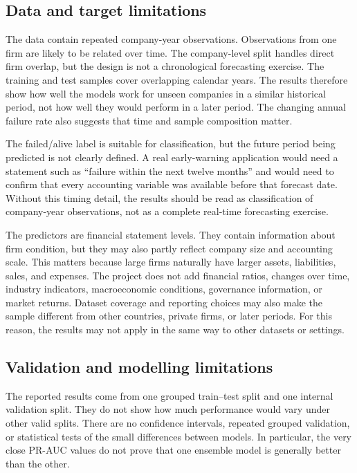 \documentclass[11pt,a4paper]{article}
\begin{document}
\subsection{Data and target limitations}

The data contain repeated company-year observations. Observations from one firm
are likely to be related over time. The company-level split handles direct firm
overlap, but the design is not a chronological forecasting exercise. The
training and test samples cover overlapping calendar years. The results
therefore show how well the models work for unseen companies in a similar
historical period, not how well they would perform in a later period. The changing annual failure
rate also suggests that time and sample composition matter.

The failed/alive label is suitable for classification, but the future period
being predicted is not clearly defined. A real early-warning application
would need a statement such as ``failure within the next twelve months'' and
would need to confirm that every accounting variable was available before that
forecast date. Without this timing detail, the results should be read as
classification of company-year observations, not as a complete real-time
forecasting exercise.

The predictors are financial statement levels. They contain information about
firm condition, but they may also partly reflect company size and accounting
scale. This matters because large firms naturally have larger assets,
liabilities, sales, and expenses. The project does not add financial ratios,
changes over time, industry indicators, macroeconomic conditions, governance
information, or market returns. Dataset coverage and reporting choices may also
make the sample different from other countries, private firms, or later periods.
For this reason, the results may not apply in the same way to other datasets or
settings.

\subsection{Validation and modelling limitations}

The reported results come from one grouped train--test split and one internal
validation split. They do not show how much performance would vary under other
valid splits. There are no confidence intervals, repeated grouped validation,
or statistical tests of the small differences between models. In particular,
the very close PR-AUC values do not prove that one ensemble model is generally
better than the other.
\end{document}
